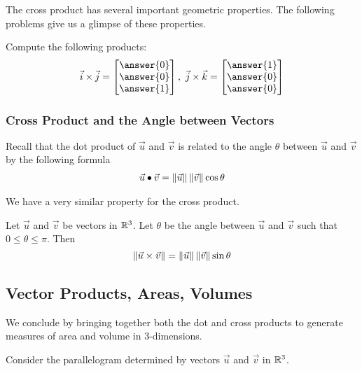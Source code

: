 \documentclass{ximera}
\begin{document}
The cross product has several important geometric properties. The following problems give us a glimpse of these properties.
 
\begin{exploration}\label{init:ijkcrossproducts}
Compute the following products:
$$\vec{i}\times\vec{j}=\begin{bmatrix}\answer{0}\\\answer{0}\\\answer{1}\end{bmatrix},\quad\vec{j}\times\vec{k}=\begin{bmatrix}\answer{1}\\\answer{0}\\\answer{0}\end{bmatrix}$$
 
\end{exploration}
 
\subsubsection*{Cross Product and the Angle between Vectors}
Recall that the dot product of $\vec{u}$ and $\vec{v}$ is related to the angle $\theta$ between $\vec{u}$ and $\vec{v}$ by the following formula
\begin{align}\label{eq:dotproductformula}\vec{u}\bullet\vec{v}=\left\|\vec{u}\right\|\left\|\vec{v}\right\|\cos\theta\end{align}

We have a very similar property for the cross product.
 
\begin{theorem}\label{th:crossproductsin}
Let $\vec{u}$ and $\vec{v}$ be vectors in $\mathbb{R}^3$. Let $\theta$ be the angle between $\vec{u}$ and $\vec{v}$ such that $0\leq\theta\leq \pi$. Then
$$\left\|\vec{u}\times\vec{v}\right\|=\left\|\vec{u}\right\|\left\|\vec{v}\right\|\sin\theta$$
\end{theorem}

\subsection*{Vector Products, Areas, Volumes}
 
We conclude by bringing together both the dot and cross products to generate measures of area and volume in $3$-dimensions.

Consider the parallelogram determined by vectors $\vec{u}$ and $\vec{v}$ in $\mathbb{R}^3$.
 
\begin{center}
\end{center}
 
\end{document}
